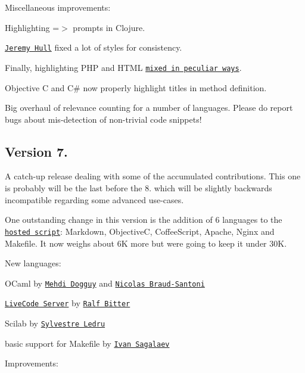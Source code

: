 Miscellaneous improvements\+:


\begin{DoxyItemize}
\item Highlighting {\ttfamily =$>$} prompts in Clojure.
\item \href{https://github.com/sourrust}{\tt Jeremy Hull} fixed a lot of styles for consistency.
\item Finally, highlighting P\+HP and H\+T\+ML \href{https://twitter.com/highlightjs/status/408890903017689088}{\tt mixed in peculiar ways}.
\item Objective C and C\# now properly highlight titles in method definition.
\item Big overhaul of relevance counting for a number of languages. Please do report bugs about mis-\/detection of non-\/trivial code snippets!
\end{DoxyItemize}

\subsection*{Version 7.}

A catch-\/up release dealing with some of the accumulated contributions. This one is probably will be the last before the 8. which will be slightly backwards incompatible regarding some advanced use-\/cases.

One outstanding change in this version is the addition of 6 languages to the \href{/soft/highlight/en/download/}{\tt hosted script}\+: Markdown, ObjectiveC, Coffee\+Script, Apache, Nginx and Makefile. It now weighs about 6K more but we\textquotesingle{}re going to keep it under 30K.

New languages\+:


\begin{DoxyItemize}
\item O\+Caml by \href{https://github.com/mehdid}{\tt Mehdi Dogguy} and \href{https://github.com/nbraud}{\tt Nicolas Braud-\/\+Santoni}
\item \href{http://livecode.com/developers/guides/server/}{\tt Live\+Code Server} by \href{https://github.com/revig}{\tt Ralf Bitter}
\item Scilab by \href{https://github.com/sylvestre}{\tt Sylvestre Ledru}
\item basic support for Makefile by \href{https://github.com/isagalaev}{\tt Ivan Sagalaev}
\end{DoxyItemize}

Improvements\+:


